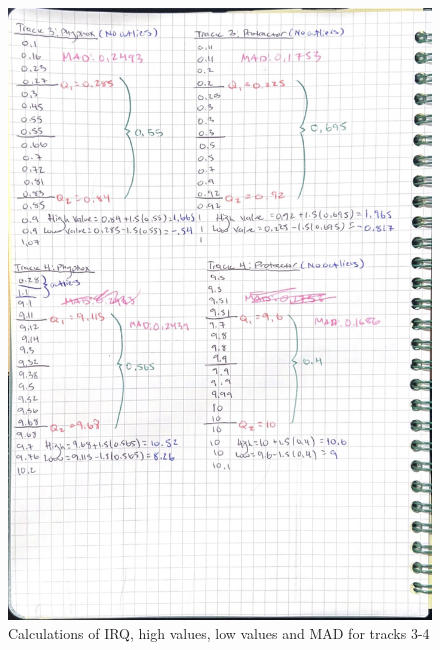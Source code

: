 \documentclass[idxtotoc,hyperref,openany]{labbook} %
\begin{document}
\begin{figure}[H] %
\begin{center}
\includegraphics[width=0.9\linewidth]{images/Lab.01/PhyProTrack3-4.png}
\end{center}
\caption{Calculations of IRQ, high values, low values and MAD for tracks 3-4}
\label{fig:Track3-4PhyphoxProtractor}
\end{figure}
\end{document}
